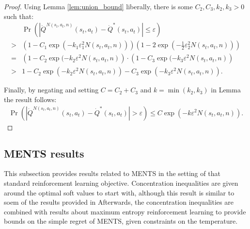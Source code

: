 \begin{proof}
        Using Lemma \ref{lem:union_bound} liberally, there is some $C_2,C_3,k_2,k_3>0$ such that:
        \begin{align}
            &\Pr\left(\left| \dot{Q}^{N(s_t,a_t,n)}(s_t,a_t) - \dot{Q}^*(s_t,a_t) \right| \leq \varepsilon \right) \\
                >& \left(1-C_1\exp(-k_1\varepsilon_1^2 N(s_t,a_t,n))\right) 
                    \left(1-2\exp\left(-\frac{1}{2}\varepsilon_2^2 N(s_t,a_t,n) \right)\right) \\
                =& \left(1-C_2\exp(-k_2 \varepsilon^2 N(s_t,a_t,n) \right) 
                    \cdot \left(1-C_3\exp(-k_3 \varepsilon^2 N(s_t,a_t,n)\right) \\
                >& 1 -C_2\exp(-k_2 \varepsilon^2 N(s_t,a_t,n)) -C_3\exp(-k_3 \varepsilon^2 N(s_t,a_t,n)).
        \end{align}
        
        Finally, by negating and setting $C=C_2+C_3$ and $k=\min(k_2,k_3)$ in Lemma  the result follows:
        \begin{align}
                \Pr\left(\left| \dot{Q}^{N(s_t,a_t,n)}(s_t,a_t) - \dot{Q}^*(s_t,a_t) \right| > \varepsilon \right) \leq C\exp(-k\varepsilon^2 N(s_t,a_t,n)).
        \end{align}
    \end{proof}















  
\subsection{MENTS results} \label{app:ments_results}

    This subsection provides results related to MENTS in the setting of that standard reinforcement learning objective. Concentration inequalities are given around the optimal soft values to start with, although this result is similar to soem of the results provided in \cite{ments}  Afterwards, the concentration inequalities are combined with results about maximum entropy reinforcement learning  to provide bounds on the simple regret of MENTS, given constraints on the temperature.
    








